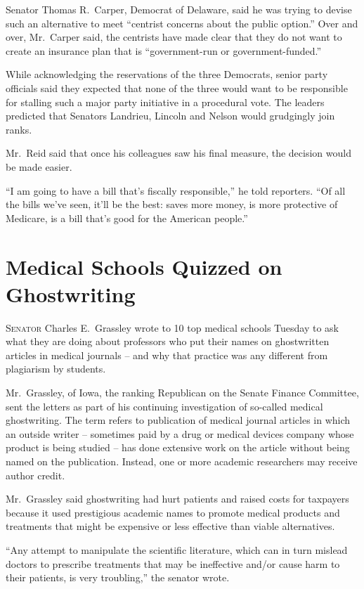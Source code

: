 ﻿\documentclass[12pt]{article}
\begin{document}
Senator Thomas R.~Carper, Democrat of Delaware, said he was trying to devise such an alternative to
meet ``centrist concerns about the public option.'' Over and over, Mr.~Carper said, the centrists
have made clear that they do not want to create an insurance plan that is ``government-run or
government-funded.''

While acknowledging the reservations of the three Democrats, senior party officials said they
expected that none of the three would want to be responsible for stalling such a major party
initiative in a procedural vote. The leaders predicted that Senators Landrieu, Lincoln and Nelson
would grudgingly join ranks.

Mr.~Reid said that once his colleagues saw his final measure, the decision would be made easier.

``I am going to have a bill that's fiscally responsible,'' he told reporters. ``Of all the bills
we've seen, it'll be the best: saves more money, is more protective of Medicare, is a bill that's
good for the American people.''

\section{Medical Schools Quizzed on Ghostwriting}

\lettrine{S}{enator} Charles E.~Grassley wrote to 10 top medical schools
Tuesday to ask what they are doing about professors who put their names on ghostwritten articles in
medical journals -- and why that practice was any different from plagiarism by students.

Mr.~Grassley, of Iowa, the ranking Republican on the Senate Finance Committee, sent the letters as
part of his continuing investigation of so-called medical ghostwriting. The term refers to
publication of medical journal articles in which an outside writer -- sometimes paid by a drug or
medical devices company whose product is being studied -- has done extensive work on the article
without being named on the publication. Instead, one or more academic researchers may receive author
credit.

Mr.~Grassley said ghostwriting had hurt patients and raised costs for taxpayers because it used
prestigious academic names to promote medical products and treatments that might be expensive or
less effective than viable alternatives.

``Any attempt to manipulate the scientific literature, which can in turn mislead doctors to
prescribe treatments that may be ineffective and/or cause harm to their patients, is very
troubling,'' the senator wrote.
\end{document}
